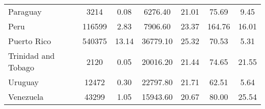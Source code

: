 \begin{table}[ht]
\begin{tabular}{l|cccccc}
  Paraguay & 3214 & 0.08 & 6276.40 & 21.01 & 75.69 & 9.45 \\ 
  Peru & 116599 & 2.83 & 7906.60 & 23.37 & 164.76 & 16.01 \\ 
  Puerto Rico & 540375 & 13.14 & 36779.10 & 25.32 & 70.53 & 5.31 \\ 
  Trinidad and Tobago & 2120 & 0.05 & 20016.20 & 21.44 & 74.65 & 21.55 \\ 
  Uruguay & 12472 & 0.30 & 22797.80 & 21.71 & 62.51 & 5.64 \\ 
  Venezuela & 43299 & 1.05 & 15943.60 & 20.67 & 80.00 & 25.54 \\ 
   \hline
\end{tabular}
\end{table}
